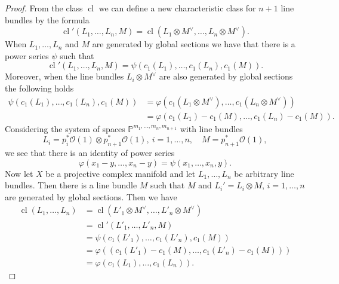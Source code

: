 \documentclass[10pt,twoside]{article}
\numberwithin{equation}{section}
\theoremstyle{plain}
\theoremstyle{definition}
\DeclareMathOperator{\cl}{cl}
\begin{document}
\begin{proof}
  From the class $\cl$ we can define a new characteristic class for $n+1$ line
  bundles by the formula
  \begin{displaymath}
    \cl'(L_{1},\dots ,L_{n},M)=\cl(L_{1}\otimes M^{\vee},\dots
    ,L_{n}\otimes M^{\vee}). 
  \end{displaymath}
  When $L_{1},\dots ,L_{n}$ and $M$ are generated by global sections
  we have that there is a power series $\psi $ such that
  \begin{displaymath}
    \cl'(L_{1},\dots ,L_{n},M)=
    \psi (c_{1}(L_{1}),\dots ,c_{1}(L_{n}),c_{1}(M)).
  \end{displaymath}
  Moreover, when the line bundles $L_{i}\otimes M^{\vee}$ are also
  generated by global 
  sections the following holds
  \begin{align*}
    \psi (c_{1}(L_{1}),\dots
    ,c_{1}(L_{n}),c_{1}(M))&=\varphi(c_{1}(L_{1}\otimes M^{\vee}),\dots
    ,c_{1}(L_{n}\otimes M^{\vee}))\\
    &=\varphi(c_{1}(L_{1})-c_1(M),\dots
    ,c_{1}(L_{n})-c_{1}(M)). 
  \end{align*}
  Considering the system of spaces $\mathbb{P}^{m_{1},\dots
    ,m_{n},m_{n+1}}$ with line bundles
  \begin{displaymath}
    L_{i}=p_{i}^{\ast}\mathcal{O}(1)\otimes
    p_{n+1}^{\ast}\mathcal{O}(1),\ i=1,\dots ,n,\quad
    M=p_{n+1}^{\ast}\mathcal{O}(1),
  \end{displaymath}
  we see that there is an identity of power series
  \begin{displaymath}
    \varphi(x_{1}-y,\dots ,x_{n}-y)=\psi (x_{1},\dots, x_{n},y).
  \end{displaymath}
  Now let $X$ be a projective complex manifold and let $L_{1}, \dots ,
  L_{n}$ be arbitrary line bundles. Then there is a line bundle $M$
  such that $M$ and $L_{i}'=L_{i}\otimes M$, $i=1,\dots ,n$ are
  generated by global sections. Then we have
  \begin{align*}
    \cl(L_{1},\dots ,L_{n})&=\cl(L'_{1}\otimes M^{\vee},\dots
    ,L'_{n}\otimes M^{\vee})\\
    &=\cl'(L'_{1},\dots ,L'_{n},M)\\
    &=\psi (c_{1}(L'_{1}),\dots ,c_{1}(L'_{n}),c_{1}(M))\\
    &=\varphi((c_{1}(L'_{1})-c_{1}(M),\dots
    ,c_{1}(L'_{n})-c_{1}(M)))\\
    &=\varphi(c_{1}(L_{1}),\dots ,c_{1}(L_{n})).
  \end{align*}


\end{proof}
\end{document}

